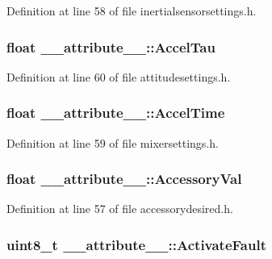 \-Definition at line 58 of file inertialsensorsettings.\-h.

\hypertarget{struct____attribute_____a0148fbf5871044e0ae14ed50be24a234}{
\subsubsection[{\-Accel\-Tau}]{\setlength{\rightskip}{0pt plus 5cm}float {\bf \-\_\-\-\_\-attribute\-\_\-\-\_\-\-::\-Accel\-Tau}}}\label{struct____attribute_____a0148fbf5871044e0ae14ed50be24a234}


\-Definition at line 60 of file attitudesettings.\-h.

\hypertarget{struct____attribute_____a41ecce3b33affcaddc61a8f1f5eb7333}{
\subsubsection[{\-Accel\-Time}]{\setlength{\rightskip}{0pt plus 5cm}float {\bf \-\_\-\-\_\-attribute\-\_\-\-\_\-\-::\-Accel\-Time}}}\label{struct____attribute_____a41ecce3b33affcaddc61a8f1f5eb7333}


\-Definition at line 59 of file mixersettings.\-h.

\hypertarget{struct____attribute_____a025c06116a6a060e68a74c6b5d6259f5}{
\subsubsection[{\-Accessory\-Val}]{\setlength{\rightskip}{0pt plus 5cm}float {\bf \-\_\-\-\_\-attribute\-\_\-\-\_\-\-::\-Accessory\-Val}}}\label{struct____attribute_____a025c06116a6a060e68a74c6b5d6259f5}


\-Definition at line 57 of file accessorydesired.\-h.

\hypertarget{struct____attribute_____a7e0c61f60d83022eba472d798f7fa929}{
\subsubsection[{\-Activate\-Fault}]{\setlength{\rightskip}{0pt plus 5cm}uint8\-\_\-t {\bf \-\_\-\-\_\-attribute\-\_\-\-\_\-\-::\-Activate\-Fault}}}\label{struct____attribute_____a7e0c61f60d83022eba472d798f7fa929}


